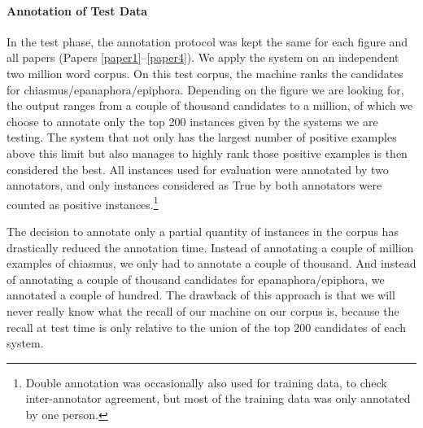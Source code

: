 \paragraph{Annotation of Test Data}
In the test phase, the annotation protocol was kept the same for each figure and all papers (Papers \ref{paper1}--\ref{paper4}). We apply the system on an independent two million word corpus. On this test corpus, the machine ranks the candidates for chiasmus/epanaphora/epiphora. Depending on the figure we are looking for, the output ranges from a couple of thousand candidates to a million, of which we choose to annotate only the top 200 instances given by the systems we are testing. The system that not only has the largest number of positive examples above this limit but also manages to highly rank those positive examples is then considered the best. All instances used for evaluation were annotated by two annotators, and only instances considered as True by both annotators were counted
as positive instances.\footnote{Double annotation was occasionally also used for training data, to check inter-annotator agreement, but most of the training data was only annotated by one person.}

The decision to annotate only a partial quantity of instances in the corpus has  drastically reduced the annotation time. Instead of annotating a couple of million examples of chiasmus, we only had to annotate a couple of thousand. And instead of annotating a couple of thousand candidates for epanaphora/epiphora, we annotated a couple of hundred. The drawback of this approach is that we will never really know what the recall of our machine on our corpus is, because the recall at test time is only relative to the union of the top 200 candidates of each system.
